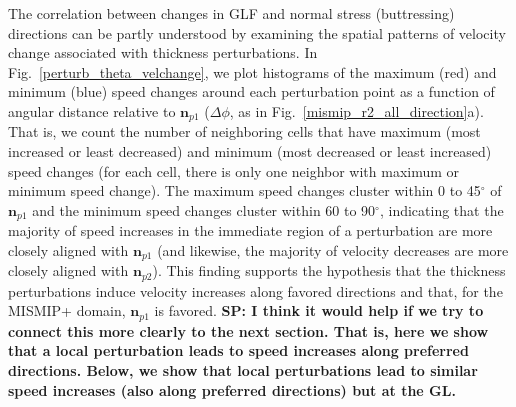 \documentclass[tc, manuscript]{copernicus}
\begin{document}
The correlation between changes in GLF and normal stress (buttressing) directions can be partly understood by examining the spatial patterns of velocity change associated with thickness perturbations. %
In Fig.~\ref{perturb_theta_velchange}, we plot histograms of the maximum (red) and minimum (blue) speed changes around each perturbation point as a function of angular distance relative to $\mathbf{n}_{p1}$ ($\Delta\phi$, as in Fig.~\ref{mismip_r2_all_direction}a). That is, we count the number of neighboring cells that have maximum (most increased or least decreased) and minimum (most decreased or least increased) speed changes (for each cell, there is only one neighbor with maximum or minimum speed change).  %
The maximum speed changes cluster within 0 to 45$^\circ$ of $\mathbf{n}_{p1}$ and the minimum speed changes cluster within 60 to 90$^\circ$, indicating that the majority of speed increases in the immediate region of a perturbation are more closely aligned with $\mathbf{n}_{p1}$ (and likewise, the majority of velocity decreases are more closely aligned with $\mathbf{n}_{p2}$). This finding supports the hypothesis that the thickness perturbations induce velocity increases along favored directions and that, for the MISMIP+ domain, $\mathbf{n}_{p1}$ is favored. 
\textbf{SP: I think it would help if we try to connect this more clearly to the next section. That is, here we show that a local perturbation leads to speed increases along preferred directions. Below, we show that local perturbations lead to similar speed increases (also along preferred directions) but at the GL.}

\end{document}
